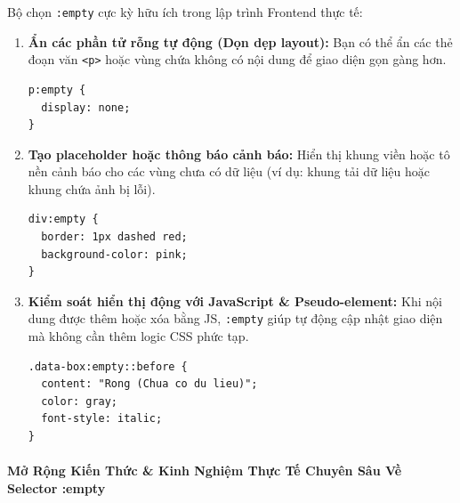 \documentclass[11pt,oneside]{book}
\newcommand{\codeinline}[1]{\textcolor{accentOrange}{\texttt{#1}}}
\begin{document}
\begin{conceptBox}
Bộ chọn \codeinline{:empty} cực kỳ hữu ích trong lập trình Frontend thực tế:
\begin{enumerate}[leftmargin=1.5em, itemsep=4pt, parsep=0pt]
    \item \textbf{Ẩn các phần tử rỗng tự động (Dọn dẹp layout):} Bạn có thể ẩn các thẻ đoạn văn \codeinline{<p>} hoặc vùng chứa không có nội dung để giao diện gọn gàng hơn.
\begin{codeWindow}
\begin{lstlisting}[language=CSS3]
p:empty {
  display: none;
}
\end{lstlisting}
\end{codeWindow}

    \item \textbf{Tạo placeholder hoặc thông báo cảnh báo:} Hiển thị khung viền hoặc tô nền cảnh báo cho các vùng chưa có dữ liệu (ví dụ: khung tải dữ liệu hoặc khung chứa ảnh bị lỗi).
\begin{codeWindow}
\begin{lstlisting}[language=CSS3]
div:empty {
  border: 1px dashed red;
  background-color: pink;
}
\end{lstlisting}
\end{codeWindow}

    \item \textbf{Kiểm soát hiển thị động với JavaScript \& Pseudo-element:} Khi nội dung được thêm hoặc xóa bằng JS, \codeinline{:empty} giúp tự động cập nhật giao diện mà không cần thêm logic CSS phức tạp.
\begin{codeWindow}
\begin{lstlisting}[language=CSS3]
.data-box:empty::before {
  content: "Rong (Chua co du lieu)";
  color: gray;
  font-style: italic;
}
\end{lstlisting}
\end{codeWindow}
\end{enumerate}
\end{conceptBox}


\paragraph{Mở Rộng Kiến Thức \& Kinh Nghiệm Thực Tế Chuyên Sâu Về Selector :empty}
\mbox{}\par\vspace{2pt}
\end{document}

